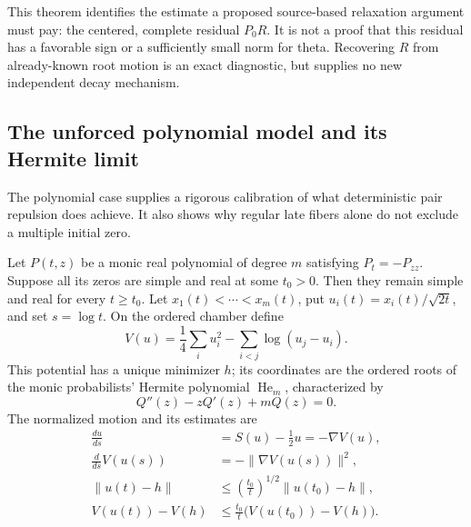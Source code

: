 This theorem identifies the estimate a proposed source-based relaxation
argument must pay: the centered, complete residual \(P_0R\).  It is not
a proof that this residual has a favorable sign or a sufficiently small
norm for theta.  Recovering \(R\) from already-known root motion is an
exact diagnostic, but supplies no new independent decay mechanism.

\subsection{The unforced polynomial model and its Hermite limit}
\label{pm:hermite-subsection}

The polynomial case supplies a rigorous calibration of what deterministic
pair repulsion does achieve.  It also shows why regular late fibers alone
do not exclude a multiple initial zero.

\begin{theorem}
\label{pm:hermite-relaxation}
Let \(P(t,z)\) be a monic real polynomial of degree \(m\) satisfying
\(P_t=-P_{zz}\).  Suppose all its zeros are simple and real at some
\(t_0>0\).  Then they remain simple and real for every \(t\ge t_0\).
Let \(x_1(t)<\cdots<x_m(t)\), put
\(u_i(t)=x_i(t)/\sqrt{2t}\), and set \(s=\log t\).  On the ordered
chamber define
\begin{equation}
 V(u)=\frac14\sum_i u_i^2-\sum_{i<j}\log(u_j-u_i).
 \label{pm:hermite-potential}
\end{equation}
This potential has a unique minimizer \(h\); its coordinates are the
ordered roots of the monic probabilists' Hermite polynomial
\(\operatorname{He}_m\), characterized by
\[
 Q''(z)-zQ'(z)+mQ(z)=0.
\]
The normalized motion and its estimates are
\begin{align}
 \frac{du}{ds}&=S(u)-\frac12u=-\nabla V(u),
 \label{pm:hermite-gradient-flow}\\
 \frac{d}{ds}V(u(s))&=-\|\nabla V(u(s))\|^2,
 \label{pm:hermite-dissipation}\\
 \|u(t)-h\|&\le\left(\frac{t_0}{t}\right)^{1/2}
                              \|u(t_0)-h\|,
 \label{pm:hermite-distance}\\
 V(u(t))-V(h)&\le\frac{t_0}{t}
                              \bigl(V(u(t_0))-V(h)\bigr).
 \label{pm:hermite-energy-decay}
\end{align}
\end{theorem}

